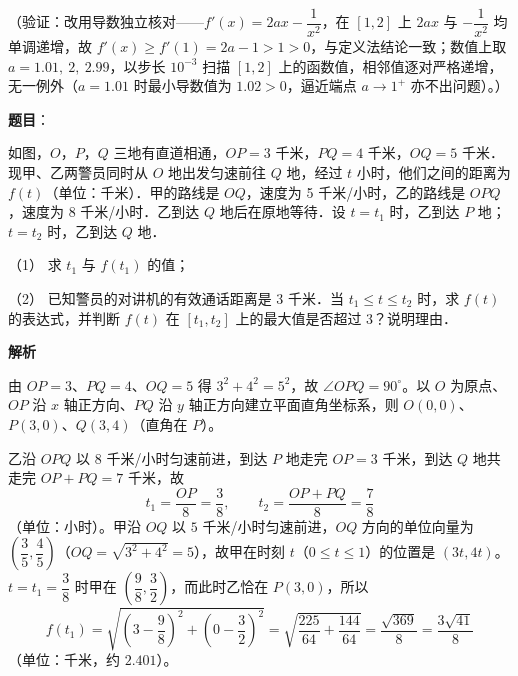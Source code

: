 \begin{answer}
（验证：改用导数独立核对——\(f'(x)=2ax-\dfrac{1}{x^{2}}\)，在 \([1,2]\) 上 \(2ax\) 与 \(-\dfrac{1}{x^{2}}\) 均单调递增，故 \(f'(x)\geqslant f'(1)=2a-1>1>0\)，与定义法结论一致；数值上取 \(a=1.01,\ 2,\ 2.99\)，以步长 \(10^{-3}\) 扫描 \([1,2]\) 上的函数值，相邻值逐对严格递增，无一例外（\(a=1.01\) 时最小导数值为 \(1.02>0\)，逼近端点 \(a\to1^{+}\) 亦不出问题）。）



\end{answer}
\begin{answer}

\textbf{题目}：

如图，\(O\)，\(P\)，\(Q\) 三地有直道相通，\(OP=3\) 千米，\(PQ=4\) 千米，\(OQ=5\) 千米．现甲、乙两警员同时从 \(O\) 地出发匀速前往 \(Q\) 地，经过 \(t\) 小时，他们之间的距离为 \(f(t)\)（单位：千米）．甲的路线是 \(OQ\)，速度为 5 千米/小时，乙的路线是 \(OPQ\)，速度为 8 千米/小时．乙到达 \(Q\) 地后在原地等待．设 \(t=t_{1}\) 时，乙到达 \(P\) 地；\(t=t_{2}\) 时，乙到达 \(Q\) 地．

（1） 求 \(t_{1}\) 与 \(f(t_{1})\) 的值；

（2） 已知警员的对讲机的有效通话距离是 3 千米．当 \(t_{1}\leqslant t\leqslant t_{2}\) 时，求 \(f(t)\) 的表达式，并判断 \(f(t)\) 在 \([t_{1},t_{2}]\) 上的最大值是否超过 3？说明理由．
\nopagebreak[4]
\begin{center}\end{center}
\nopagebreak[4]
\textbf{解析}

由 \(OP=3\)、\(PQ=4\)、\(OQ=5\) 得 \(3^{2}+4^{2}=5^{2}\)，故 \(\angle OPQ=90^{\circ}\)。以 \(O\) 为原点、\(OP\) 沿 \(x\) 轴正方向、\(PQ\) 沿 \(y\) 轴正方向建立平面直角坐标系，则 \(O(0,0)\)、\(P(3,0)\)、\(Q(3,4)\)（直角在 \(P\)）。


乙沿 \(OPQ\) 以 \(8\) 千米/小时匀速前进，到达 \(P\) 地走完 \(OP=3\) 千米，到达 \(Q\) 地共走完 \(OP+PQ=7\) 千米，故
\nopagebreak[4]
\[
t_{1}=\frac{OP}{8}=\frac{3}{8},\qquad t_{2}=\frac{OP+PQ}{8}=\frac{7}{8}
\]
（单位：小时）。甲沿 \(OQ\) 以 \(5\) 千米/小时匀速前进，\(OQ\) 方向的单位向量为 \(\left(\dfrac{3}{5},\dfrac{4}{5}\right)\)（\(OQ=\sqrt{3^{2}+4^{2}}=5\)），故甲在时刻 \(t\)（\(0\leqslant t\leqslant1\)）的位置是 \((3t,4t)\)。\(t=t_{1}=\dfrac{3}{8}\) 时甲在 \(\left(\dfrac{9}{8},\dfrac{3}{2}\right)\)，而此时乙恰在 \(P(3,0)\)，所以
\nopagebreak[4]
\[
f(t_{1})=\sqrt{\left(3-\frac{9}{8}\right)^{2}+\left(0-\frac{3}{2}\right)^{2}}=\sqrt{\frac{225}{64}+\frac{144}{64}}=\frac{\sqrt{369}}{8}=\frac{3\sqrt{41}}{8}
\]
（单位：千米，约 \(2.401\)）。


\end{answer}
